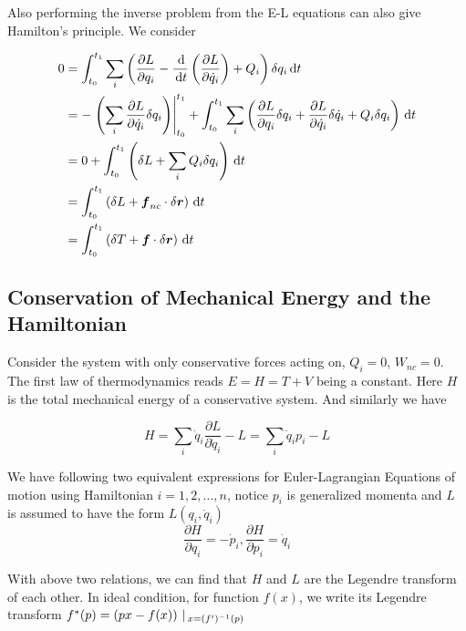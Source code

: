 \documentclass{article}
\begin{document}
Also performing the inverse problem from the E-L equations can also give Hamilton's principle. We consider

\begin{align*}
    0&=\int_{t_0}^{t_1} \sum_i \left( \frac{\partial L}{\partial q_i}-\frac{\,\mathrm{d} }{\,\mathrm{d} t}\left( \frac{\partial L}{\partial \dot q_i} \right)+Q_i \right)\delta q_i \,\mathrm{d} t\\
    &=- \left.\left( \sum_i \frac{\partial L}{\partial \dot q_i}\delta q_i \right)\right|_{t_0}^{t_1}+\int_{t_0}^{t_1} \sum_i\left( \frac{\partial L}{\partial q_i}\delta q_i+\frac{\partial L}{\partial \dot q_i}\delta\dot q_i+Q_i\delta q_i \right)\,\mathrm{d} t\\
    &= 0+\int_{t_0}^{t_1} \left( \delta L+\sum_iQ_i \delta q_i \right)\,\mathrm{d} t\\
    &= \int_{t_0}^{t_1} \left( \delta L+\boldsymbol{f}_{nc}\cdot \delta\boldsymbol{r} \right)\,\mathrm{d} t\\
    &= \int_{t_0}^{t_1} \left( \delta T+\boldsymbol{f}     \cdot \delta\boldsymbol{r} \right)\,\mathrm{d} t
\end{align*}

\subsection{Conservation of Mechanical Energy and the Hamiltonian}

Consider the system with only conservative forces acting on, \(Q_i=0\), \(W_{nc}=0\). The first law of thermodynamics reads \(E=H=T+V\) being a constant. Here \(H\) is the total mechanical energy of a conservative system. And similarly we have

\[H = \sum_i \dot q_i\frac{\partial L}{\partial \dot q_i}-L=\sum_i \dot q_i p_i -L\]

\begin{proposition}
    We have following two equivalent expressions for Euler-Lagrangian Equations of motion using Hamiltonian \(i=1,2,\dots,n\), notice \(p_i\) is generalized momenta and \(L\) is assumed to have the form \(L(q_i,\dot q_i)\)
    \[\frac{\partial H}{\partial q_i}=-\dot p_i,\frac{\partial H}{\partial p_i}=\dot q_i\]
\end{proposition}

\begin{remark}
    With above two relations, we can find that \(H\) and \(L\) are the Legendre transform of each other. In ideal condition, for function \(f(x)\), we write its Legendre transform \(f^*(p)=\left( px-f(x) \right)\,|\,_{x=(f')^{-1}(p)}\)
\end{remark} 
\end{document}
